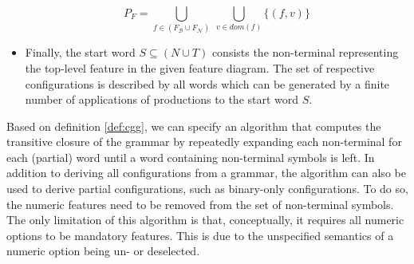 \begin{definition}
\begin{itemize}
  \begin{equation}
  P_F = \bigcup_{f \in (F_\mathcal{B} \cup F_\mathcal{N})} ~ \bigcup_{v \in
  dom(f)} \lbrace (f, v) \rbrace
  \end{equation}
	
  \item Finally, the start word $S \subseteq (N \cup T)$ consists the
  non-terminal representing the top-level feature in the given feature diagram.
  The set of respective configurations is described by all words which can be
  generated by a finite number of applications of productions to the start word
  $S$.
  
  \end{itemize}
\end{definition}

Based on definition \ref{def:cgg}, we can specify an algorithm that computes the
transitive closure of the grammar by repeatedly expanding each non-terminal for
each (partial) word until a word containing non-terminal symbols is left.
In addition to deriving all configurations from a grammar, the
algorithm can also be used to derive partial configurations, such as
binary-only configurations. To do so, the numeric features need to be removed
from the set of non-terminal symbols. The only limitation of this algorithm is
that, conceptually, it requires all numeric options to be mandatory features.
This is due to the unspecified semantics of a numeric option being un- or
deselected.

